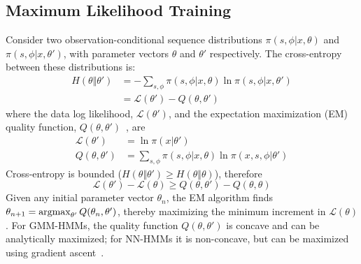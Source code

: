 \subsection{Maximum Likelihood Training}

Consider two observation-conditional sequence distributions
$\pi(s,\phi|x,\theta)$ and $\pi(s,\phi|x,\theta')$, with parameter
vectors $\theta$ and $\theta'$ respectively.  The cross-entropy
between these distributions is:
\begin{align}
  H\left(\theta\Vert\theta'\right) &=
  -\sum_{s,\phi} \pi(s,\phi|x,\theta)
  \ln \pi(s,\phi|x,\theta')\\
  &=  {\mathcal L}\left(\theta'\right)-Q\left(\theta,\theta'\right)
  \label{eq:crossentropy}
\end{align}
where the data log likelihood, ${\mathcal L}\left(\theta'\right)$, and
the expectation maximization (EM) quality function,
$Q\left(\theta,\theta'\right)$~\cite{Dempster77}, are
\begin{align}
  {\mathcal L}\left(\theta'\right) &= \ln \pi(x|\theta')
  \label{eq:loglikelihood}\\
  Q\left(\theta,\theta'\right)
  &=
  \sum_{s,\phi} \pi(s,\phi|x,\theta)\ln \pi(x,s,\phi |\theta')
   \label{eq:Qfunction}
\end{align}
Cross-entropy is bounded ($H\left(\theta\Vert\theta'\right)\ge
H\left(\theta\Vert\theta\right)$), therefore
\begin{equation}
  {\mathcal L}\left(\theta'\right)-{\mathcal L}\left(\theta\right)\ge
  Q\left(\theta,\theta'\right)-
  Q\left(\theta,\theta\right)
  \label{eq:LgeQ}
\end{equation}
Given any initial parameter vector $\theta_n$, the EM
algorithm finds $\theta_{n+1}=\operatorname*{argmax}_{\theta'}
Q(\theta_n,\theta')$, thereby maximizing the minimum increment in
${\mathcal L}(\theta)$.  For GMM-HMMs, the quality function
$Q\left(\theta,\theta'\right)$ is concave and can be analytically
maximized; for NN-HMMs it is non-concave, but can be maximized using
gradient ascent~\cite{Bengio92}.

